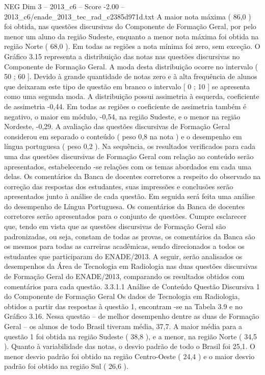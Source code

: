 \begin{textsample}{NEG Dim 3 – 2013\_c6 – Score -2.00 – 2013\_c6/enade\_2013\_tec\_rad\_c2385d971d.txt}
A maior nota máxima ( 86,0 ) foi obtida, nas questões discursivas do Componente de Formação Geral, por pelo menor um aluno da região Sudeste, enquanto a menor nota máxima foi obtida na região Norte ( 68,0 ).
Em todas as regiões a nota mínima foi zero, sem exceção.
O Gráfico 3.15 representa a distribuição das notas nas questões discursivas no Componente de Formação Geral.
A moda desta distribuição ocorre no intervalo ( 50 ; 60 ].
Devido à grande quantidade de notas zero e à alta frequência de alunos que deixaram este tipo de questão em branco o intervalo [ 0 ; 10 ] se apresenta como uma segunda moda.
A distribuição possui assimetria à esquerda, coeficiente de assimetria -0,44.
Em todas as regiões o coeficiente de assimetria também é negativo, o maior em módulo, -0,54, na região Sudeste, e o menor na região Nordeste, -0,29.
A avaliação das questões discursivas de Formação Geral considerou em separado o conteúdo ( peso 0,8 na nota ) e o desempenho em língua portuguesa ( peso 0,2 ).
Na sequência, os resultados verificados para cada uma das questões discursivas de Formação Geral com relação ao conteúdo serão apresentados, estabelecendo -se relações com os temas abordados em cada uma delas.
Os comentários da Banca de docentes corretores a respeito do observado na correção das respostas dos estudantes, suas impressões e conclusões serão apresentados junto à análise de cada questão.
Em seguida será feita uma análise do desempenho de Língua Portuguesa.
Os comentários da Banca de docentes corretores serão apresentados para o conjunto de questões.
Cumpre esclarecer que, tendo em vista que as questões discursivas de Formação Geral são padronizadas, ou seja, constam de todas as provas, os comentários da Banca são os mesmos para todas as carreiras acadêmicas, sendo direcionados a todos os estudantes que participaram do ENADE/2013.
A seguir, serão analisados os desempenhos da Área de Tecnologia em Radiologia nas duas questões discursivas de Formação Geral do ENADE/2013, comparando os resultados obtidos com comentários para cada questão. 3.3.1.1 Análise de Conteúdo Questão Discursiva 1 do Componente de Formação Geral Os dados de Tecnologia em Radiologia, obtidos a partir das respostas à questão 1, encontram -se na Tabela 3.9 e no Gráfico 3.16.
Nessa questão – de melhor desempenho dentre as duas de Formação Geral – os alunos de todo Brasil tiveram média, 37,7.
A maior média para a questão 1 foi obtida na região Sudeste ( 38,8 ), e a menor, na região Norte ( 34,5 ).
Quanto à variabilidade das notas, o desvio padrão de todo o Brasil foi 25,1.
O menor desvio padrão foi obtido na região Centro-Oeste ( 24,4 ) e o maior desvio padrão foi obtido na região Sul ( 26,6 ).

\end{textsample}
